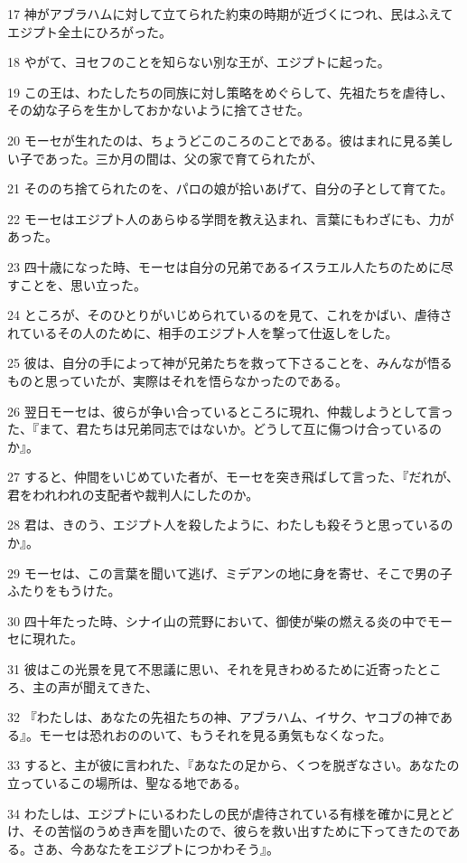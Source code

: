 \par 17 神がアブラハムに対して立てられた約束の時期が近づくにつれ、民はふえてエジプト全土にひろがった。
\par 18 やがて、ヨセフのことを知らない別な王が、エジプトに起った。
\par 19 この王は、わたしたちの同族に対し策略をめぐらして、先祖たちを虐待し、その幼な子らを生かしておかないように捨てさせた。
\par 20 モーセが生れたのは、ちょうどこのころのことである。彼はまれに見る美しい子であった。三か月の間は、父の家で育てられたが、
\par 21 そののち捨てられたのを、パロの娘が拾いあげて、自分の子として育てた。
\par 22 モーセはエジプト人のあらゆる学問を教え込まれ、言葉にもわざにも、力があった。
\par 23 四十歳になった時、モーセは自分の兄弟であるイスラエル人たちのために尽すことを、思い立った。
\par 24 ところが、そのひとりがいじめられているのを見て、これをかばい、虐待されているその人のために、相手のエジプト人を撃って仕返しをした。
\par 25 彼は、自分の手によって神が兄弟たちを救って下さることを、みんなが悟るものと思っていたが、実際はそれを悟らなかったのである。
\par 26 翌日モーセは、彼らが争い合っているところに現れ、仲裁しようとして言った、『まて、君たちは兄弟同志ではないか。どうして互に傷つけ合っているのか』。
\par 27 すると、仲間をいじめていた者が、モーセを突き飛ばして言った、『だれが、君をわれわれの支配者や裁判人にしたのか。
\par 28 君は、きのう、エジプト人を殺したように、わたしも殺そうと思っているのか』。
\par 29 モーセは、この言葉を聞いて逃げ、ミデアンの地に身を寄せ、そこで男の子ふたりをもうけた。
\par 30 四十年たった時、シナイ山の荒野において、御使が柴の燃える炎の中でモーセに現れた。
\par 31 彼はこの光景を見て不思議に思い、それを見きわめるために近寄ったところ、主の声が聞えてきた、
\par 32 『わたしは、あなたの先祖たちの神、アブラハム、イサク、ヤコブの神である』。モーセは恐れおののいて、もうそれを見る勇気もなくなった。
\par 33 すると、主が彼に言われた、『あなたの足から、くつを脱ぎなさい。あなたの立っているこの場所は、聖なる地である。
\par 34 わたしは、エジプトにいるわたしの民が虐待されている有様を確かに見とどけ、その苦悩のうめき声を聞いたので、彼らを救い出すために下ってきたのである。さあ、今あなたをエジプトにつかわそう』。
